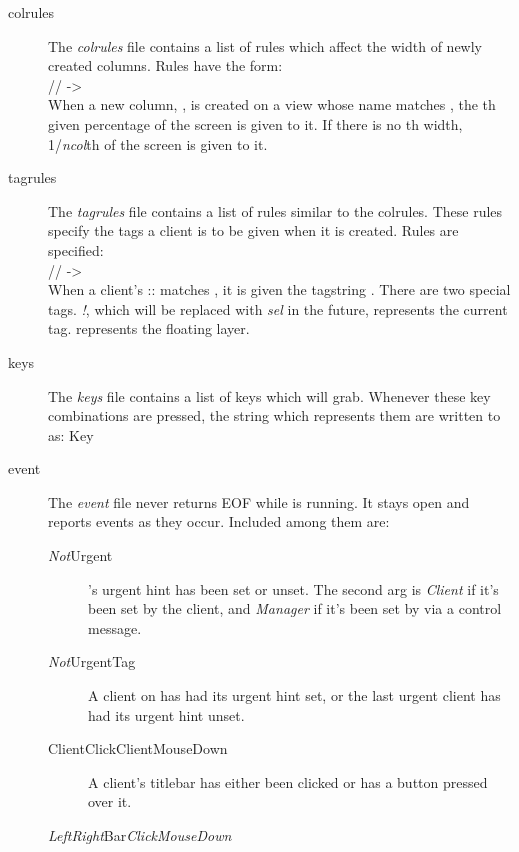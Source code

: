 \begin{description}
\item[colrules] The \emph{colrules} file contains a list of
	rules which affect the width of newly created columns.
	Rules have the form: \\ \SP %
	\MANbr
	\SP\SP // ->  \\ \SP
	\MANbr
	When a new column, , is created on a view whose
	name matches , the th given
	 percentage of the screen is given to it. If
	there is no th width, 1/\emph{ncol}th of the
	screen is given to it.
\item[tagrules] The \emph{tagrules} file contains a list of
	rules similar to the colrules. These rules specify 
	the tags a client is to be given when it is created.
	Rules are specified: \\ \SP
	\MANbr
	\SP\SP // ->  \\ \SP
	\MANbr
	When a client's ::
	matches , it is given the tagstring
	. There are two special tags. \emph{!}, which
	will be replaced with \emph{sel} in the future,
	represents the current tag. \emph{\Circum} represents the
	floating layer.
\item[keys] The \emph{keys} file contains a list of keys which
	 will grab. Whenever these key combinations
	are pressed, the string which represents them are
	written to  as: Key 
\item[event] The \emph{event} file never returns EOF while
	 is running. It stays open and reports events
	as they occur. Included among them are:
	\begin{description}
	\item[\emph{Not}Urgent  ]
		's urgent hint has been set or
		unset. The second arg is \emph{Client} if it's
		been set by the client, and \emph{Manager} if
		it's been set by  via a control
		message.
	\item[\emph{Not}UrgentTag  ]
		A client on  has had its urgent hint
		set, or the last urgent client has had its
		urgent hint unset.
	\item[ClientClick\Bar ClientMouseDown  ]
		A client's titlebar has either been clicked or
		has a button pressed over it.
	\item[\emph{Left\Bar Right}Bar\emph{Click\Bar MouseDown}  ]

\end{description}
\end{description}

